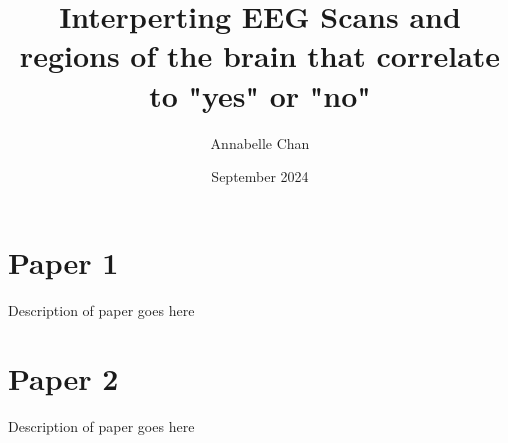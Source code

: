 \documentclass[12pt]{article}
\title{Interperting EEG Scans and regions of the brain that correlate to "yes" or "no"}
\author{Annabelle Chan}
\date{September 2024}
\begin{document}
\maketitle

\section{Paper 1}
Description of paper goes here

\section{Paper 2}
Description of paper goes here
\end{document}
